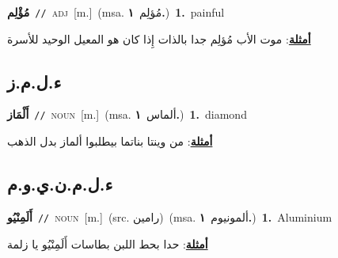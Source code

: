 \documentclass[10pt,a4paper,twoside]{article} %
\begin{document}
\begin{multicols}{2}
{\setlength\topsep{0pt}\textbf{\foreignlanguage{arabic}{مُؤْلِم}}\ {\color{gray}\texttt{//}\color{black}}\ \textsc{adj}\ [m.]\ \color{gray}(msa. \foreignlanguage{arabic}{مُؤلِم}~\foreignlanguage{arabic}{\textbf{١.}})\color{black}\ \textbf{1.}~painful\  \begin{flushright}\color{gray}\foreignlanguage{arabic}{\textbf{\underline{\foreignlanguage{arabic}{أمثلة}}}: موت الأب مُؤلِم جدا بالذات إِذا كان هو المعيل الوحيد للأسرة}\end{flushright}\color{black}} \vspace{2mm}

\vspace{-3mm}
\subsection*{\color{blue}\foreignlanguage{arabic}{ء.ل.م.ز}\color{blue}{ (ntws)}} 

{\setlength\topsep{0pt}\textbf{\foreignlanguage{arabic}{أَلْمَاز}}\ {\color{gray}\texttt{//}\color{black}}\ \textsc{noun}\ [m.]\ \color{gray}(msa. \foreignlanguage{arabic}{ألماس}~\foreignlanguage{arabic}{\textbf{١.}})\color{black}\ \textbf{1.}~diamond\  \begin{flushright}\color{gray}\foreignlanguage{arabic}{\textbf{\underline{\foreignlanguage{arabic}{أمثلة}}}: من وينتا بناتما بيطلبوا ألماز بدل الذهب}\end{flushright}\color{black}} \vspace{2mm}

\vspace{-3mm}
\subsection*{\color{blue}\foreignlanguage{arabic}{ء.ل.م.ن.ي.و.م}\color{blue}{ (ntws)}} 

{\setlength\topsep{0pt}\textbf{\foreignlanguage{arabic}{أَلَمِنْيُو}}\ {\color{gray}\texttt{//}\color{black}}\ \textsc{noun}\ [m.]\ (src. \color{gray}\foreignlanguage{arabic}{رامين}\color{black})\ \color{gray}(msa. \foreignlanguage{arabic}{ألمونيوم}~\foreignlanguage{arabic}{\textbf{١.}})\color{black}\ \textbf{1.}~Aluminium\  \begin{flushright}\color{gray}\foreignlanguage{arabic}{\textbf{\underline{\foreignlanguage{arabic}{أمثلة}}}: حدا بحط اللبن بطاسات أَلَمِنْيُو يا زلمة}\end{flushright}\color{black}} \vspace{2mm}


\end{multicols}
\end{document}
